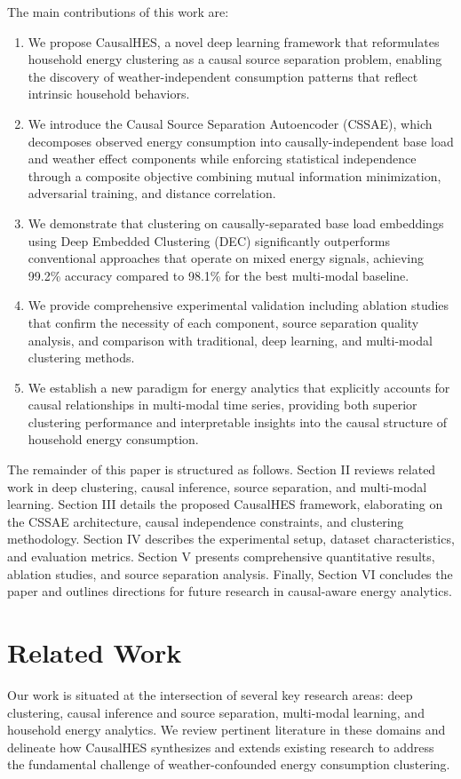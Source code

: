 \documentclass[journal]{IEEEtran}
\begin{document}
The main contributions of this work are:
\begin{enumerate}
    \item We propose CausalHES, a novel deep learning framework that reformulates household energy clustering as a causal source separation problem, enabling the discovery of weather-independent consumption patterns that reflect intrinsic household behaviors.
    \item We introduce the Causal Source Separation Autoencoder (CSSAE), which decomposes observed energy consumption into causally-independent base load and weather effect components while enforcing statistical independence through a composite objective combining mutual information minimization, adversarial training, and distance correlation.
    \item We demonstrate that clustering on causally-separated base load embeddings using Deep Embedded Clustering (DEC) significantly outperforms conventional approaches that operate on mixed energy signals, achieving 99.2\% accuracy compared to 98.1\% for the best multi-modal baseline.
    \item We provide comprehensive experimental validation including ablation studies that confirm the necessity of each component, source separation quality analysis, and comparison with traditional, deep learning, and multi-modal clustering methods.
    \item We establish a new paradigm for energy analytics that explicitly accounts for causal relationships in multi-modal time series, providing both superior clustering performance and interpretable insights into the causal structure of household energy consumption.
\end{enumerate}

The remainder of this paper is structured as follows. Section II reviews related work in deep clustering, causal inference, source separation, and multi-modal learning. Section III details the proposed CausalHES framework, elaborating on the CSSAE architecture, causal independence constraints, and clustering methodology. Section IV describes the experimental setup, dataset characteristics, and evaluation metrics. Section V presents comprehensive quantitative results, ablation studies, and source separation analysis. Finally, Section VI concludes the paper and outlines directions for future research in causal-aware energy analytics.

\section{Related Work}
Our work is situated at the intersection of several key research areas: deep clustering, causal inference and source separation, multi-modal learning, and household energy analytics. We review pertinent literature in these domains and delineate how CausalHES synthesizes and extends existing research to address the fundamental challenge of weather-confounded energy consumption clustering.
\end{document}
